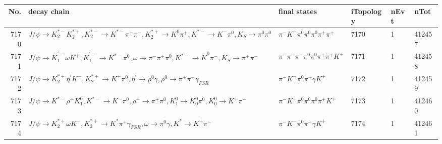 \begin{table}[htbp] 
\begin{center}
\begin{small}
\begin{tabular}{rlllll}\hline\hline
 No. & decay chain & final states &  iTopology & nEvt & nTot \\\hline
7170&$J/\psi       \rightarrow K_2^{*-}       K_2^{*+}       , K_2^{*-}        \rightarrow K^{*-}         \pi^{+}        \pi^{-}        , K_2^{*+}        \rightarrow K^{0}          \pi^{+}        , K^{*-}          \rightarrow K^{-}          \pi^{0}        , K_{S}           \rightarrow \pi^{0}        \pi^{0}        $&$\pi^{-}        K^{-}          \pi^{0}        \pi^{0}        \pi^{0}        \pi^{+}        \pi^{+}        $& 7170&    1&412457\\
7171&$J/\psi       \rightarrow \bar{K}_1^{'-}\omega         K^{+}          , \bar{K}_1^{'-} \rightarrow K^{*-}         \pi^{0}        , \omega          \rightarrow \pi^{-}        \pi^{+}        \pi^{0}        , K^{*-}          \rightarrow \bar{K}^{0}   \pi^{-}        , K_{S}           \rightarrow \pi^{+}        \pi^{-}        $&$\pi^{-}        \pi^{-}        \pi^{-}        \pi^{0}        \pi^{0}        \pi^{+}        \pi^{+}        K^{+}          $& 7171&    1&412458\\
7172&$J/\psi       \rightarrow K_2^{*+}       \eta^{\prime} K^{-}          , K_2^{*+}        \rightarrow K^{+}          \pi^{0}        , \eta^{\prime}  \rightarrow \rho^{0}      \gamma       , \rho^{0}       \rightarrow \pi^{+}        \pi^{-}        \gamma_{FSR} $&$\pi^{-}        K^{-}          \pi^{0}        \pi^{+}        \gamma       K^{+}          $& 7172&    1&412459\\
7173&$J/\psi       \rightarrow K^{*-}         \rho^{+}      K_1^{0}        , K^{*-}          \rightarrow K^{-}          \pi^{0}        , \rho^{+}       \rightarrow \pi^{+}        \pi^{0}        , K_1^{0}         \rightarrow K_0^{0}        \pi^{0}        , K_0^{0}         \rightarrow K^{+}          \pi^{-}        $&$\pi^{-}        K^{-}          \pi^{0}        \pi^{0}        \pi^{0}        \pi^{+}        K^{+}          $& 7173&    1&412460\\
7174&$J/\psi       \rightarrow K_2^{*+}       \omega         K^{-}          , K_2^{*+}        \rightarrow K^{*}          \pi^{+}        \gamma_{FSR} , \omega          \rightarrow \pi^{0}        \gamma       , K^{*}           \rightarrow K^{+}          \pi^{-}        $&$\pi^{-}        K^{-}          \pi^{0}        \pi^{+}        \gamma       K^{+}          $& 7174&    1&412461\\

\end{tabular}
\end{small}
\end{center}
\end{table}
